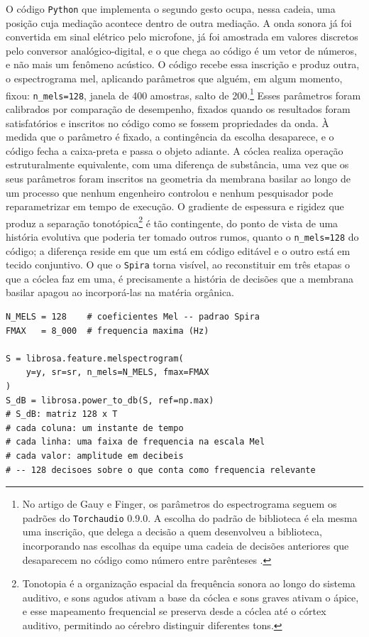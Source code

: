 O código \texttt{Python} que implementa o segundo gesto ocupa, nessa cadeia, uma posição cuja mediação acontece dentro de outra mediação. A onda sonora já foi convertida em sinal elétrico pelo microfone, já foi amostrada em valores discretos pelo conversor analógico-digital, e o que chega ao código é um vetor de números, e não mais um fenômeno acústico. O código recebe essa inscrição e produz outra, o espectrograma mel, aplicando parâmetros que alguém, em algum momento, fixou: \texttt{n\_mels=128}, janela de 400 amostras, salto de 200.\footnote{No artigo de Gauy e Finger, os parâmetros do espectrograma seguem os padrões do \texttt{Torchaudio} 0.9.0. A escolha do padrão de biblioteca é ela mesma uma inscrição, que delega a decisão a quem desenvolveu a biblioteca, incorporando nas escolhas da equipe uma cadeia de decisões anteriores que desaparecem no código como número entre parênteses \parencite[p.~8]{GauyFinger2023}.} Esses parâmetros foram calibrados por comparação de desempenho, fixados quando os resultados foram satisfatórios e inscritos no código como se fossem propriedades da onda. À medida que o parâmetro é fixado, a contingência da escolha desaparece, e o código fecha a caixa-preta e passa o objeto adiante. A cóclea realiza operação estruturalmente equivalente, com uma diferença de substância, uma vez que os seus parâmetros foram inscritos na geometria da membrana basilar ao longo de um processo que nenhum engenheiro controlou e nenhum pesquisador pode reparametrizar em tempo de execução. O gradiente de espessura e rigidez que produz a separação tonotópica\footnote{Tonotopia é a organização espacial da frequência sonora ao longo do sistema auditivo, e sons agudos ativam a base da cóclea e sons graves ativam o ápice, e esse mapeamento frequencial se preserva desde a cóclea até o córtex auditivo, permitindo ao cérebro distinguir diferentes tons.} é tão contingente, do ponto de vista de uma história evolutiva que poderia ter tomado outros rumos, quanto o \texttt{n\_mels=128} do código; a diferença reside em que um está em código editável e o outro está em tecido conjuntivo. O que o \texttt{Spira} torna visível, ao reconstituir em três etapas o que a cóclea faz em uma, é precisamente a história de decisões que a membrana basilar apagou ao incorporá-las na matéria orgânica.

\begin{lstlisting}[caption={Do sinal à matriz: a transformação espectral (ver Figuras~\protect\ref{fig:espectrograma-sem-legenda} e~\ref{fig:espectrograma-com-eixos}).}]
N_MELS = 128    # coeficientes Mel -- padrao Spira
FMAX   = 8_000  # frequencia maxima (Hz)

S = librosa.feature.melspectrogram(
    y=y, sr=sr, n_mels=N_MELS, fmax=FMAX
)
S_dB = librosa.power_to_db(S, ref=np.max)
# S_dB: matriz 128 x T
# cada coluna: um instante de tempo
# cada linha: uma faixa de frequencia na escala Mel
# cada valor: amplitude em decibeis
# -- 128 decisoes sobre o que conta como frequencia relevante
\end{lstlisting}

